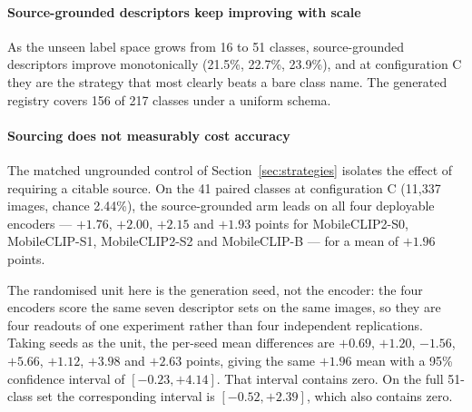 \documentclass[a4paper,fleqn]{cas-dc}
\begin{document}
\paragraph{Source-grounded descriptors keep improving with scale} As the unseen label space grows
from 16 to 51 classes, source-grounded descriptors improve monotonically (21.5\%, 22.7\%, 23.9\%),
and at configuration C they are the strategy that most clearly beats a bare class name. The generated
registry covers 156 of 217 classes under a uniform schema.


\paragraph{Sourcing does not measurably cost accuracy} The matched ungrounded control of
Section~\ref{sec:strategies} isolates the effect of requiring a citable source. On the 41 paired
classes at configuration C (11{,}337 images, chance 2.44\%), the source-grounded arm leads on all
four deployable encoders --- $+1.76$, $+2.00$, $+2.15$ and $+1.93$ points for MobileCLIP2-S0,
MobileCLIP-S1, MobileCLIP2-S2 and MobileCLIP-B --- for a mean of $+1.96$ points.

The randomised unit here is the generation seed, not the encoder: the four encoders score the same
seven descriptor sets on the same images, so they are four readouts of one experiment rather than
four independent replications. Taking seeds as the unit, the per-seed mean differences are
$+0.69$, $+1.20$, $-1.56$, $+5.66$, $+1.12$, $+3.98$ and $+2.63$ points, giving the same $+1.96$
mean with a 95\% confidence interval of $[-0.23, +4.14]$. That interval contains zero. On the full
51-class set the corresponding interval is $[-0.52, +2.39]$, which also contains zero.
\end{document}

